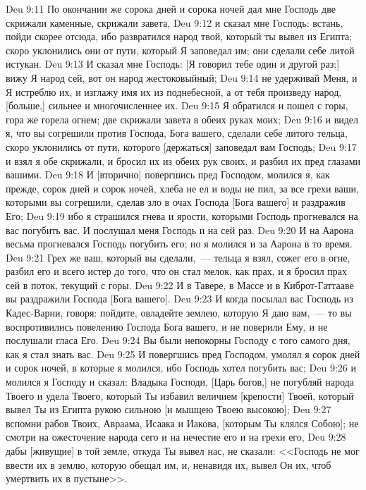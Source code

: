 \vs Deu 9:11 По окончании же сорока дней и сорока ночей дал мне Господь две скрижали каменные, скрижали завета,
\vs Deu 9:12 и сказал мне Господь: встань, пойди скорее отсюда, ибо развратился народ твой, который ты вывел из Египта; скоро уклонились они от пути, который Я заповедал им; они сделали себе литой истукан.
\vs Deu 9:13 И сказал мне Господь: [Я говорил тебе один и другой раз:] вижу Я народ сей, вот он народ жестоковыйный;
\vs Deu 9:14 не удерживай Меня, и Я истреблю их, и изглажу имя их из поднебесной, а от тебя произведу народ,  [больше,] сильнее и многочисленнее их.
\vs Deu 9:15 Я обратился и пошел с горы, гора же горела огнем; две скрижали завета  в обеих руках моих;
\vs Deu 9:16 и видел я, что вы согрешили против Господа, Бога вашего, сделали себе литого тельца, скоро уклонились от пути, которого [держаться] заповедал вам Господь;
\vs Deu 9:17 и взял я обе скрижали, и бросил их из обеих рук своих, и разбил их пред глазами вашими.
\vs Deu 9:18 И [вторично] повергшись пред Господом, молился я, как прежде, сорок дней и сорок ночей, хлеба не ел и воды не пил, за все грехи ваши, которыми вы согрешили, сделав зло в очах Господа [Бога вашего] и раздражив Его;
\vs Deu 9:19 ибо я страшился гнева и ярости, которыми Господь прогневался на вас  погубить вас. И послушал меня Господь и на сей раз.
\vs Deu 9:20 И на Аарона весьма прогневался Господь  погубить его; но я молился и за Аарона в то время.
\vs Deu 9:21 Грех же ваш, который вы сделали,~--- тельца я взял, сожег его в огне, разбил его и всего истер до того, что он стал мелок, как прах, и я бросил прах сей в поток, текущий с горы.
\vs Deu 9:22 И в Тавере, в Массе и в Киброт-Гаттааве вы раздражили Господа [Бога вашего].
\vs Deu 9:23 И когда посылал вас Господь из Кадес-Варни, говоря: пойдите, овладейте землею, которую Я даю вам,~--- то вы воспротивились повелению Господа Бога вашего, и не поверили Ему, и не послушали гласа Его.
\vs Deu 9:24 Вы были непокорны Господу с того самого дня, как я стал знать вас.
\vs Deu 9:25 И повергшись пред Господом, умолял я сорок дней и сорок ночей, в которые я молился, ибо Господь хотел погубить вас;
\vs Deu 9:26 и молился я Господу и сказал: Владыка Господи, [Царь богов,] не погубляй народа Твоего и удела Твоего, который Ты избавил величием [крепости] Твоей, который вывел Ты из Египта рукою сильною [и мышцею Твоею высокою];
\vs Deu 9:27 вспомни рабов Твоих, Авраама, Исаака и Иакова, [которым Ты клялся Собою]; не смотри на ожесточение народа сего и на нечестие его и на грехи его,
\vs Deu 9:28 дабы [живущие] в той земле, откуда Ты вывел нас, не сказали: <<Господь не мог ввести их в землю, которую обещал им, и, ненавидя их, вывел Он их, чтоб умертвить их в пустыне>>.

